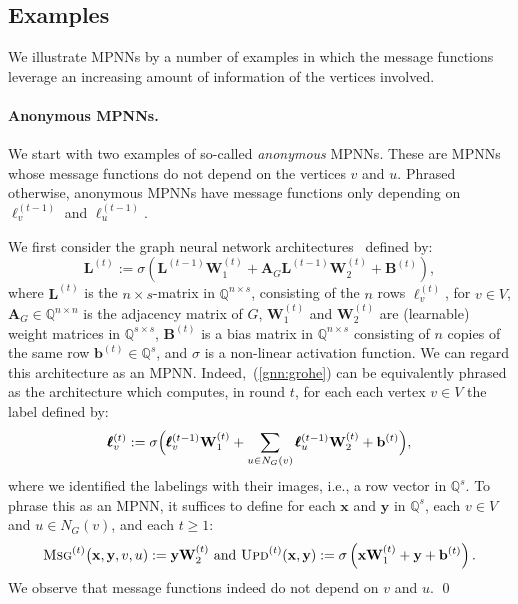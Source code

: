 \subsection{Examples}
We illustrate MPNNs by a number of examples in which the message functions leverage an increasing amount of information of the vertices involved. 

\paragraph{Anonymous MPNNs.}
We start with two examples of so-called \textit{anonymous}  MPNNs. These are MPNNs whose message functions do not depend on the vertices $v$ and $u$. Phrased otherwise, anonymous MPNNs have message functions only depending on $\pmb{\ell}_v^{(t-1)}$ and $\pmb{\ell}_u^{(t-1)}$.
\begin{example}\normalfont
We first consider
the graph neural network
architectures~\cite{Hamilton2017a,grohewl} defined by:
\begin{equation}
\mathbf{L}^{(t)}:=\sigma\left(\mathbf{L}^{(t-1)}\mathbf{W}_1^{(t)}+\mathbf{A}_G\mathbf{L}^{(t-1)}\mathbf{W}_2^{(t)}+\mathbf{B}^{(t)}\right), \label{gnn:grohe}
\end{equation}
where $\mathbf{L}^{(t)}$ is the $n\times s$-matrix in $\mathbb{Q}^{n\times s}$, consisting of the $n$ rows $\pmb{\ell}^{(t)}_v$, for $v\in V$, $\mathbf{A}_G\in\mathbb{Q}^{n\times n}$ is the adjacency matrix of $G$, $\mathbf{W}_1^{(t)}$ and $\mathbf{W}_2^{(t)}$ are (learnable) weight matrices in $\mathbb{Q}^{s\times s}$,
$\mathbf{B}^{(t)}$ is a bias matrix in $\mathbb{Q}^{n\times s}$ consisting of $n$ copies of the same row $\mathbf{b}^{(t)}\in \mathbb{Q}^s$, and $\sigma$ is a non-linear activation function. We can regard this architecture as an MPNN. Indeed,~(\ref{gnn:grohe}) can be equivalently phrased as the architecture which computes, in round $t$, for each each vertex $v\in V$ the label defined by:
$$
\pmb{\ell}^{(t)}_v:=\sigma\Bigl(\pmb{\ell}^{(t-1)}_v\mathbf{W}_1^{(t)}+ \sum_{u\in N_G(v)}\pmb{\ell}^{(t-1)}_u\mathbf{W}_2^{(t)}+\mathbf{b}^{(t)} \Bigr),
$$
where we identified the labelings with their images, i.e., a row vector in $\mathbb{Q}^s$. 
To phrase this as an MPNN, it suffices to define for each $\mathbf{x}$ and $\mathbf{y}$ in $\mathbb{Q}^s$, each $v\in V$ and $u\in N_G(v)$, and each $t\geq 1$:
\begin{equation*}
	\textsc{Msg}^{(t)}\bigl(\mathbf{x},\mathbf{y},v,u):=\mathbf{y}\mathbf{W}_2^{(t)}
\text{ and } 
\textsc{Upd}^{(t)}(\mathbf{x},\mathbf{y}):=\sigma\left(\mathbf{x}\mathbf{W}_1^{(t)}+\mathbf{y} + \mathbf{b}^{(t)}\right).
\end{equation*} 
We observe that  message functions indeed do not depend on $v$ and $u$. \qed
\end{example}
